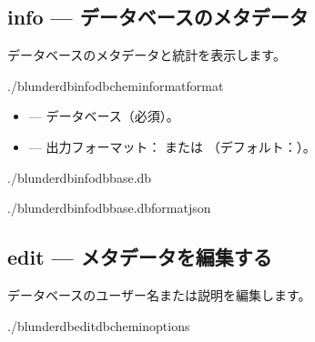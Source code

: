 \documentclass[letterpaper,10pt,dvipdfmx]{sphinxmanual}
\begin{document}
\subsection{info — データベースのメタデータ}
\label{\detokenize{cli:info-metadonnees-de-la-base}}
\sphinxAtStartPar
データベースのメタデータと統計を表示します。

\begin{sphinxVerbatim}[commandchars=\\\{\}]
./blunderdbinfo\PYGZhy{}\PYGZhy{}db\PYGZlt{}chemin\PYGZgt{}\PYG{o}{[}\PYGZhy{}\PYGZhy{}format\PYGZlt{}format\PYGZgt{}\PYG{o}{]}
\end{sphinxVerbatim}

\sphinxAtStartPar
{}
\begin{itemize}
\item {} 
\sphinxAtStartPar
{} — データベース（必須）。

\item {} 
\sphinxAtStartPar
{} — 出力フォーマット： または （デフォルト：）。

\end{itemize}

\sphinxAtStartPar
{}

\begin{sphinxVerbatim}[commandchars=\\\{\}]
./blunderdbinfo\PYGZhy{}\PYGZhy{}dbbase.db

./blunderdbinfo\PYGZhy{}\PYGZhy{}dbbase.db\PYGZhy{}\PYGZhy{}formatjson
\end{sphinxVerbatim}


\subsection{edit — メタデータを編集する}
\label{\detokenize{cli:edit-modifier-les-metadonnees}}
\sphinxAtStartPar
データベースのユーザー名または説明を編集します。

\begin{sphinxVerbatim}[commandchars=\\\{\}]
./blunderdbedit\PYGZhy{}\PYGZhy{}db\PYGZlt{}chemin\PYGZgt{}\PYG{o}{[}options\PYG{o}{]}
\end{sphinxVerbatim}
\end{document}
